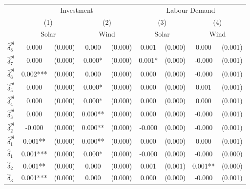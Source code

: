 {
\def\sym#1{\ifmmode^{#1}\else\(^{#1}\)\fi}
\begin{tabular}{l*{4}{cc}}
\toprule
            &\multicolumn{4}{c}{Investment}                           &\multicolumn{4}{c}{Labour Demand}                        \\\cmidrule(lr){2-5}\cmidrule(lr){6-9}
            &\multicolumn{2}{c}{(1)}     &\multicolumn{2}{c}{(2)}     &\multicolumn{2}{c}{(3)}     &\multicolumn{2}{c}{(4)}     \\
            &\multicolumn{2}{c}{Solar}   &\multicolumn{2}{c}{Wind}    &\multicolumn{2}{c}{Solar}   &\multicolumn{2}{c}{Wind}    \\
\midrule
$\hat{\delta}_8^{pl}$&       0.000   &     (0.000)&       0.000   &     (0.000)&       0.001   &     (0.000)&       0.000   &     (0.001)\\
$\hat{\delta}_7^{pl}$&       0.000   &     (0.000)&       0.000*  &     (0.000)&       0.001*  &     (0.000)&      -0.000   &     (0.001)\\
$\hat{\delta}_6^{pl}$&       0.002***&     (0.000)&       0.000   &     (0.000)&       0.000   &     (0.000)&      -0.000   &     (0.001)\\
$\hat{\delta}_5^{pl}$&       0.000   &     (0.000)&       0.000*  &     (0.000)&       0.000   &     (0.000)&       0.001   &     (0.001)\\
$\hat{\delta}_4^{pl}$&       0.000   &     (0.000)&       0.000*  &     (0.000)&       0.000   &     (0.000)&       0.000   &     (0.001)\\
$\hat{\delta}_3^{pl}$&       0.000   &     (0.000)&       0.000** &     (0.000)&       0.000   &     (0.000)&      -0.000   &     (0.001)\\
$\hat{\delta}_2^{pl}$&      -0.000   &     (0.000)&       0.000** &     (0.000)&      -0.000   &     (0.000)&      -0.000   &     (0.001)\\
$\hat{\delta}_1^{pl}$&       0.001** &     (0.000)&       0.000** &     (0.000)&       0.000   &     (0.000)&       0.000   &     (0.001)\\
$\hat{\delta}_1$&       0.001***&     (0.000)&       0.000*  &     (0.000)&      -0.000   &     (0.000)&      -0.000   &     (0.000)\\
$\hat{\delta}_2$&       0.001** &     (0.000)&       0.000   &     (0.000)&       0.001   &     (0.001)&       0.001** &     (0.000)\\
$\hat{\delta}_3$&       0.001***&     (0.000)&       0.000   &     (0.000)&       0.000   &     (0.000)&      -0.000   &     (0.001)\\

\end{tabular}}
